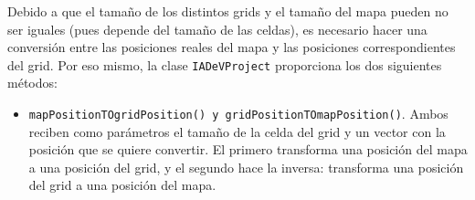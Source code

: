 Debido a que el tamaño de los distintos grids y el tamaño del mapa pueden no ser iguales (pues depende del tamaño de las celdas), es necesario hacer una conversión entre las posiciones reales del mapa y las posiciones correspondientes del grid. Por eso mismo, la clase \texttt{IADeVProject} proporciona los dos siguientes métodos:
\begin{itemize}
 \item \texttt{mapPositionTOgridPosition() y gridPositionTOmapPosition()}. Ambos reciben como parámetros el tamaño de la celda del grid y un vector con la posición que se quiere convertir. El primero transforma una posición del mapa a una posición del grid, y el segundo hace la inversa: transforma una posición del grid a una posición del mapa.
\end{itemize}


